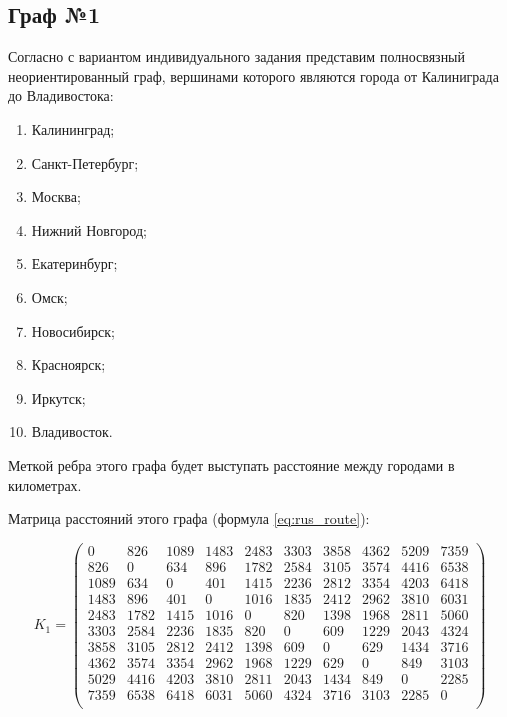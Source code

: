 \subsection{Граф №1}

Согласно с вариантом индивидуального задания представим полносвязный неориентированный граф, вершинами которого являются города от Калиниграда до Владивостока:

\begin{enumerate}[label={\arabic*)}]
	\label{list:cities}
	\item Калининград;
	\item Санкт-Петербург;
	\item Москва;
	\item Нижний Новгород;
	\item Екатеринбург;
	\item Омск;
	\item Новосибирск;
	\item Красноярск;
	\item Иркутск;
	\item Владивосток.
\end{enumerate}

Меткой ребра этого графа будет выступать расстояние между городами в километрах.

Матрица расстояний этого графа (формула \ref{eq:rus_route}):

\begin{equation}
	\label{eq:rus_route}
	K_1 = 
	\begin{pmatrix}
		0 & 826 & 1089 & 1483 & 2483 & 3303 & 3858 & 4362 & 5209 & 7359 \\ 
		826 & 0 & 634 & 896 & 1782 & 2584 & 3105 & 3574 & 4416 & 6538 \\
		1089 & 634 & 0 & 401 & 1415 & 2236 & 2812  & 3354 & 4203 & 6418 \\
		1483 & 896 & 401 & 0 & 1016  & 1835 & 2412  &  2962 & 3810 & 6031 \\
		2483 & 1782 & 1415 & 1016 & 0  & 820 & 1398  &  1968 & 2811 & 5060 \\
		3303 & 2584 & 2236 & 1835 & 820  & 0 &  609  &  1229 & 2043 & 4324 \\
		3858 & 3105 & 2812 & 2412 & 1398  & 609 &  0  &  629 & 1434 & 3716 \\
		4362 & 3574 & 3354 & 2962 & 1968  & 1229 &  629  &  0 & 849  & 3103 \\
		5029 & 4416 & 4203 & 3810 & 2811  & 2043 &  1434  &  849 & 0  & 2285 \\
		7359 & 6538 & 6418 & 6031 & 5060  & 4324 &  3716  &  3103 & 2285  & 0 \\
	\end{pmatrix}
\end{equation}

